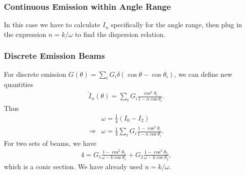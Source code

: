 \documentclass[letterpaper,12pt,english]{sphinxmanual}
\begin{document}
\subsubsection{Continuous Emission within Angle Range}
\label{\detokenize{collective/dispersion-relation:continuous-emission-within-angle-range}}
In this case we have to calculate \(I_n\) specifically for the angle range, then plug in the expression \(n=k/\omega\) to find the dispersion relation.


\subsubsection{Discrete Emission Beams}
\label{\detokenize{collective/dispersion-relation:discrete-emission-beams}}
For discrete emission \(G(\theta)=\sum_i G_i \delta(\cos\theta-\cos\theta_i)\), we can define new quantities
\begin{equation*}
\begin{split}\tilde I_n(\theta)= \sum_i G_i \frac{\cos^n\theta_i}{1 - n \cos\theta_i }.\end{split}
\end{equation*}
Thus
\begin{equation*}
\begin{split}&\omega = \frac{1}{4}(I_0-I_2) \\
\Rightarrow &\omega = \frac{1}{4} \sum_i G_i \frac{1-\cos^2\theta_i}{1 - n \cos\theta_i }.\end{split}
\end{equation*}
For two sets of beams, we have
\begin{equation*}
\begin{split}4 =  G_1 \frac{1-\cos^2\theta_1}{\omega - k\cos\theta_1 } + G_2 \frac{1-\cos^2\theta_2}{\omega - k \cos\theta_2 },\end{split}
\end{equation*}
which is a conic section. We have already used \(n=k/\omega\).
\end{document}
